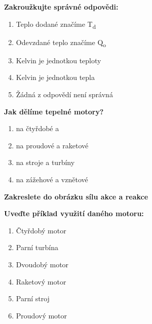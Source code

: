\documentclass[../main.tex]{subfiles}
\begin{document}
\begin{enumerate}[label={\textbf{\arabic*.}}]
\begin{minipage}{0.45\textwidth}
    \item \textbf{Zakroužkujte správné odpovědi:}
        \begin{enumerate}[label={\alph*)}, itemsep=0pt, topsep=0.15cm]
            \item {Teplo dodané značíme T\textsubscript{d}}
            \item {Odevzdané teplo značíme Q\textsubscript{o}}
            \item {Kelvin je jednotkou teploty}
            \item {Kelvin je jednotkou tepla}
            \item {Žádná z odpovědí není správná}
        \end{enumerate}
    
    \item \textbf{Jak dělíme tepelné motory?}
        \begin{enumerate}[label={\alph*)}, itemsep=0pt, topsep=0.15cm]
            \item \tecky{2cm} na čtyřdobé a \tecky{2cm}
            \item \tecky{2cm} na proudové a raketové
            \item \tecky{2cm} na \tecky{1cm} stroje a \tecky{1cm} turbíny
            \item \tecky{2cm} na zážehové a vznětové
        \end{enumerate}
\end{minipage}
\hfill
\begin{minipage}[t]{0.4\textwidth}
    \vspace{-12.75cm}

    \item \textbf{Zakreslete do obrázku sílu akce a reakce}

    \item \textbf{Uveďte příklad využití daného motoru:}
    \begin{enumerate}[label={\arabic*.}, itemsep=0pt, topsep=0.15cm]
        \item {Čtyřdobý motor}\hfill\tecky{3.75cm}
        \item {Parní turbína}\hfill\tecky{3.75cm}
        \item {Dvoudobý motor}\hfill\tecky{3.7cm}
        \item {Raketový motor}\hfill\tecky{3.75cm}
        \item {Parní stroj}\hfill\tecky{3.75cm}
        \item {Proudový motor}\hfill\tecky{3.75cm}
    \end{enumerate}
    

\end{minipage}
\end{enumerate}
\end{document}
